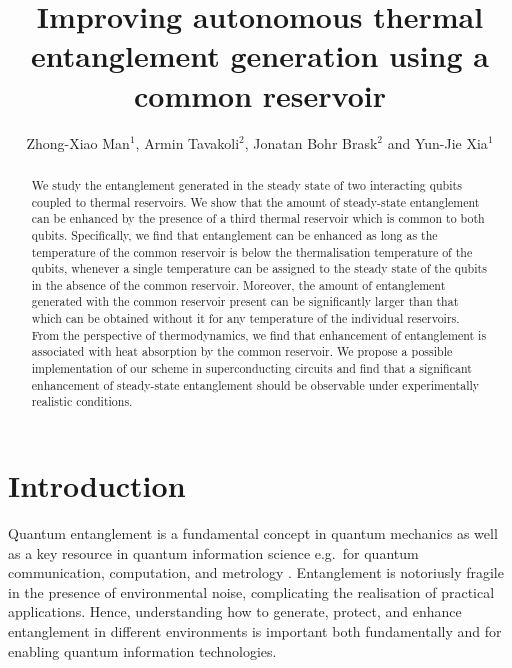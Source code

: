 \documentclass[12pt]{iopart}
\begin{document}
\title{Improving autonomous thermal entanglement generation using a common reservoir}

\author{Zhong-Xiao Man$^1$, Armin Tavakoli$^2$, Jonatan Bohr Brask$^2$ and Yun-Jie Xia$^1$}

\address{$^1$ School of Physics and Physical Engineering, Shandong Provincial Key Laboratory of Laser Polarization and Information Technology, Qufu Normal University, 273165, Qufu, China}
\address{$^2$ Department of Applied Physics, University of Geneva, 1211 Geneva, Switzerland}


\begin{abstract}
We study the entanglement generated in the steady state of two interacting qubits coupled to thermal reservoirs. We show that the amount of steady-state entanglement can be enhanced by the presence of a third thermal reservoir which is common to both qubits. Specifically, we find that entanglement can be enhanced as long as the temperature of the common reservoir is below the thermalisation temperature of the qubits, whenever a single temperature can be assigned to the steady state of the qubits in the absence of the common reservoir. Moreover, the amount of entanglement generated with the common reservoir present can be significantly larger than that which can be obtained without it for any temperature of the individual reservoirs. From the perspective of thermodynamics, we find that enhancement of entanglement is associated with heat absorption by the common reservoir. We propose a possible implementation of our scheme in superconducting circuits and find that a significant enhancement of steady-state entanglement should be observable under experimentally realistic conditions.
\end{abstract}


\section{Introduction}

Quantum entanglement is a fundamental concept in quantum mechanics as well as a key resource in quantum information science e.g.~for quantum communication, computation, and metrology \cite{ent,giovanetti2011}. Entanglement is notoriusly fragile in the presence of environmental noise, complicating the realisation of practical applications. Hence, understanding how to generate, protect, and enhance entanglement in different environments is important both fundamentally and for enabling quantum information technologies.
\end{document}
